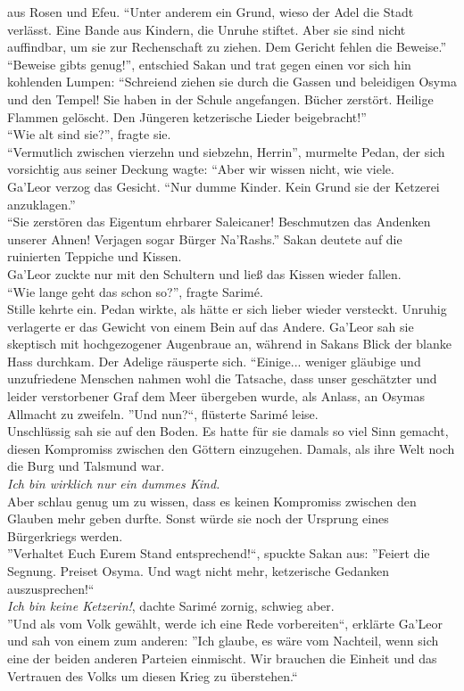 aus Rosen und Efeu. ``Unter anderem ein Grund, wieso der Adel die Stadt verlässt. Eine Bande aus 
Kindern, die Unruhe stiftet. Aber sie sind nicht auffindbar, um sie zur Rechenschaft zu ziehen. Dem 
Gericht fehlen die Beweise.''\\
``Beweise gibts genug!'', entschied Sakan und trat gegen einen vor sich hin kohlenden Lumpen: 
``Schreiend ziehen sie durch die Gassen und beleidigen Osyma und den Tempel! Sie haben in der 
Schule angefangen. Bücher zerstört. Heilige Flammen gelöscht. Den Jüngeren ketzerische Lieder 
beigebracht!''\\
``Wie alt sind sie?'', fragte sie.\\
``Vermutlich zwischen vierzehn und siebzehn, Herrin'', murmelte Pedan, der sich vorsichtig aus 
seiner Deckung wagte: ``Aber wir wissen nicht, wie viele.\\
Ga'Leor verzog das Gesicht. ``Nur dumme Kinder. Kein Grund sie der Ketzerei anzuklagen.''\\
``Sie zerstören das Eigentum ehrbarer Saleicaner! Beschmutzen das Andenken unserer Ahnen! Verjagen 
sogar Bürger Na'Rashs.'' Sakan deutete auf die ruinierten Teppiche und Kissen.\\
Ga'Leor zuckte nur mit den Schultern und ließ das Kissen wieder fallen.\\
``Wie lange geht das schon so?'', fragte Sarimé.\\
Stille kehrte ein. Pedan wirkte, als hätte er sich lieber wieder versteckt. Unruhig verlagerte er 
das Gewicht von einem Bein auf das Andere. Ga'Leor sah sie skeptisch mit hochgezogener Augenbraue 
an, während in Sakans Blick der blanke Hass durchkam. Der Adelige räusperte sich. ``Einige... 
weniger gläubige und unzufriedene Menschen nahmen wohl die Tatsache, dass unser geschätzter und 
leider verstorbener Graf dem Meer übergeben wurde, als Anlass, an Osymas Allmacht zu zweifeln. 
''Und nun?``, flüsterte Sarimé leise.\\
Unschlüssig sah sie auf den Boden. Es hatte für sie damals so viel Sinn gemacht, diesen Kompromiss 
zwischen den Göttern einzugehen. Damals, als ihre Welt noch die Burg und Talsmund war.\\
\textit{Ich bin wirklich nur ein dummes Kind.}\\
Aber schlau genug um zu wissen, dass es keinen Kompromiss zwischen den Glauben mehr geben durfte. 
Sonst würde sie noch der Ursprung eines Bürgerkriegs werden.\\
''Verhaltet Euch Eurem Stand entsprechend!``, spuckte Sakan aus: ''Feiert die Segnung. Preiset 
Osyma. Und wagt nicht mehr, ketzerische Gedanken auszusprechen!``\\
\textit{Ich bin keine Ketzerin!}, dachte Sarimé zornig, schwieg aber.\\
''Und als vom Volk gewählt, werde ich eine Rede vorbereiten``, erklärte Ga'Leor und sah von einem 
zum anderen: ''Ich glaube, es wäre vom Nachteil, wenn sich eine der beiden anderen Parteien 
einmischt. Wir brauchen die Einheit und das Vertrauen des Volks um diesen Krieg zu überstehen.``\\

